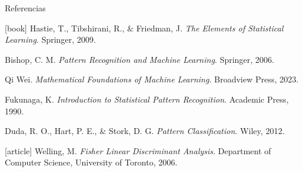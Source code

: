 \documentclass[spanish]{beamer}
\begin{document}
\begin{frame}{Referencias}
\fontsize{7pt}{10pt}\selectfont
\begin{thebibliography}{99}
[book]
 Hastie, T., Tibshirani, R., \& Friedman, J.
\newblock \emph{The Elements of Statistical Learning}.
\newblock Springer, 2009.

 Bishop, C. M.
\newblock \emph{Pattern Recognition and Machine Learning}.
\newblock Springer, 2006.

 Qi Wei.
\newblock \emph{Mathematical Foundations of Machine Learning}.
\newblock Broadview Press, 2023.

 Fukunaga, K.
\newblock \emph{Introduction to Statistical Pattern Recognition}.
\newblock Academic Press, 1990.

 Duda, R. O., Hart, P. E., \& Stork, D. G.
\newblock \emph{Pattern Classification}.
\newblock Wiley, 2012.

[article]
 Welling, M.
\newblock \emph{Fisher Linear Discriminant Analysis}.
\newblock Department of Computer Science, University of Toronto, 2006.
\end{thebibliography}
\end{frame}
\end{document}
